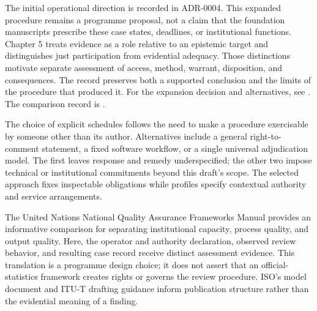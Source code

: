 \documentclass[11pt,a4paper]{article}
\begin{document}
The initial operational direction is recorded in ADR-0004. This expanded procedure remains a programme proposal, not a claim that the foundation manuscripts prescribe these case states, deadlines, or institutional functions. Chapter 5 treats evidence as a role relative to an epistemic target and distinguishes just participation from evidential adequacy. Those distinctions motivate separate assessment of access, method, warrant, disposition, and consequences. The record preserves both a supported conclusion and the limits of the procedure that produced it.
For the expansion decision and alternatives, see . The comparison record is .

The choice of explicit schedules follows the need to make a procedure exercisable by someone other than its author. Alternatives include a general right-to-comment statement, a fixed software workflow, or a single universal adjudication model. The first leaves response and remedy underspecified; the other two impose technical or institutional commitments beyond this draft's scope. The selected approach fixes inspectable obligations while profiles specify contextual authority and service arrangements.

The United Nations National Quality Assurance Frameworks Manual provides an informative comparison for separating institutional capacity, process quality, and output quality. Here, the operator and authority declaration, observed review behavior, and resulting case record receive distinct assessment evidence. This translation is a programme design choice; it does not assert that an official-statistics framework creates rights or governs the review procedure. ISO's model document and ITU-T drafting guidance inform publication structure rather than the evidential meaning of a finding.

\end{document}
